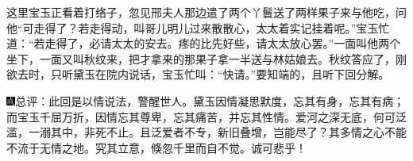 这里宝玉正看着打络子，忽见邢夫人那边遣了两个丫鬟送了两样果子来与他吃，问他``可走得了？若走得动，叫哥儿明儿过来散散心，太太着实记挂着呢。''宝玉忙道：``若走得了，必请太太的安去。疼的比先好些，请太太放心罢。''一面叫他两个坐下，一面又叫秋纹来，把才拿来的那果子拿一半送与林姑娘去。秋纹答应了，刚欲去时，只听黛玉在院内说话，宝玉忙叫：``快请。''要知端的，且听下回分解。

{\includegraphics[width=3mm]{../Images/00005}总评：此回是以情说法，警醒世人。黛玉因情凝思默度，忘其有身，忘其有病；而宝玉千屈万折，因情忘其尊卑，忘其痛苦，并忘其性情。爱河之深无底，何可泛滥，一溺其中，非死不止。且泛爱者不专，新旧叠增，岂能尽了？其多情之心不能不流于无情之地。究其立意，倏忽千里而自不觉。诚可悲乎！}
